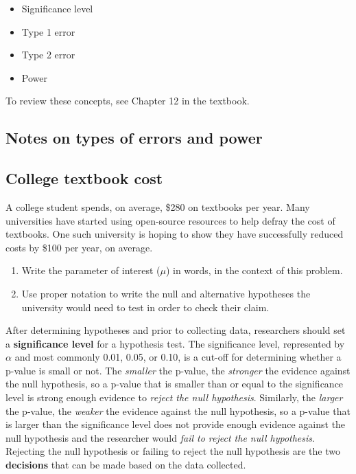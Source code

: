 \documentclass[
]{report}
\begin{document}
\begin{itemize}
\item
  Significance level
\item
  Type 1 error
\item
  Type 2 error
\item
  Power
\end{itemize}

To review these concepts, see Chapter 12 in the textbook.

\subsection*{Notes on types of errors and power}\label{notes-on-types-of-errors-and-power}

\vspace{2in}

\subsection{College textbook cost}\label{college-textbook-cost}

A college student spends, on average, \$280 on textbooks per year. Many universities have started using open-source resources to help defray the cost of textbooks. One such university is hoping to show they have successfully reduced costs by \$100 per year, on average.

\begin{enumerate}
\def\labelenumi{\arabic{enumi}.}
\item
  Write the parameter of interest (\(\mu\)) in words, in the context of this problem.
  \vspace{0.5in}
\item
  Use proper notation to write the null and alternative hypotheses the university would need to test in order to check their claim.
  \vspace{0.5in}
\end{enumerate}

After determining hypotheses and prior to collecting data, researchers should set a \textbf{significance level} for a hypothesis test. The significance level, represented by \(\alpha\) and most commonly 0.01, 0.05, or 0.10, is a cut-off for determining whether a p-value is small or not. The \emph{smaller} the p-value, the \emph{stronger} the evidence against the null hypothesis, so a p-value that is smaller than or equal to the significance level is strong enough evidence to \emph{reject the null hypothesis}. Similarly, the \emph{larger} the p-value, the \emph{weaker} the evidence against the null hypothesis, so a p-value that is larger than the significance level does not provide enough evidence against the null hypothesis and the researcher would \emph{fail to reject the null hypothesis}. Rejecting the null hypothesis or failing to reject the null hypothesis are the two \textbf{decisions} that can be made based on the data collected.
\end{document}
